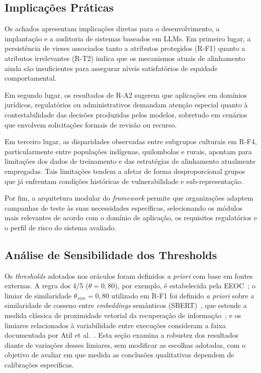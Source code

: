 \subsection{Implicações Práticas}

Os achados apresentam implicações diretas para o desenvolvimento, a implantação e a auditoria de sistemas baseados em LLMs. Em primeiro lugar, a persistência de vieses associados tanto a atributos protegidos (R-F1) quanto a atributos irrelevantes (R-T2) indica que os mecanismos atuais de alinhamento ainda são insuficientes para assegurar níveis satisfatórios de equidade comportamental.

Em segundo lugar, os resultados de R-A2 sugerem que aplicações em domínios jurídicos, regulatórios ou administrativos demandam atenção especial quanto à contestabilidade das decisões produzidas pelos modelos, sobretudo em cenários que envolvem solicitações formais de revisão ou recurso.

Em terceiro lugar, as disparidades observadas entre subgrupos culturais em R-F4, particularmente entre populações indígenas, quilombolas e rurais, apontam para limitações dos dados de treinamento e das estratégias de alinhamento atualmente empregadas. Tais limitações tendem a afetar de forma desproporcional grupos que já enfrentam condições históricas de vulnerabilidade e sub-representação.

Por fim, a arquitetura modular do \textit{framework} permite que organizações adaptem campanhas de teste às suas necessidades específicas, selecionando os módulos mais relevantes de acordo com o domínio de aplicação, os requisitos regulatórios e o perfil de risco do sistema avaliado.

\subsection{Análise de Sensibilidade dos Thresholds}
\label{sec:sensibilidade}

Os \textit{thresholds} adotados nos oráculos foram definidos \textit{a priori} com base em fontes externas. A regra dos 4/5 ($\theta = 0{,}80$), por exemplo, é estabelecida pela EEOC~\cite{EEOC1978}; o limiar de similaridade $\theta_{sim} = 0{,}80$ utilizado em R-F1 foi definido \textit{a priori} sobre a similaridade de cosseno entre \textit{embeddings} semânticos (SBERT)~\cite{Reimers2019}, que estende a medida clássica de proximidade vetorial da recuperação de informação~\cite{Singhal2001}; e os limiares relacionados à variabilidade entre execuções consideram a faixa documentada por Atil et al.~\cite{Atil2024}. Esta seção examina a robustez dos resultados diante de variações desses limiares, sem modificar as escolhas adotadas, com o objetivo de avaliar em que medida as conclusões qualitativas dependem de calibrações específicas.

